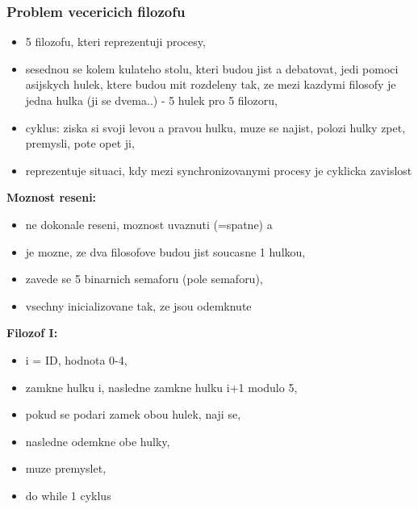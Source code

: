 \documentclass[a4paper, 11pt]{article}
\begin{document}
\subsubsection{Problem vecericich filozofu}
\begin{itemize}
    \item 5 filozofu, kteri reprezentuji procesy,
    \item sesednou se kolem kulateho stolu, kteri budou jist a debatovat, jedi pomoci asijskych hulek, ktere budou mit rozdeleny tak, ze mezi kazdymi filosofy je jedna hulka (ji se dvema..) - 5 hulek pro 5 filozoru,
    \item cyklus: ziska si svoji levou a pravou hulku, muze se najist, polozi hulky zpet, premysli, pote opet ji,
    \item reprezentuje situaci, kdy mezi synchronizovanymi procesy je cyklicka zavislost \\
\end{itemize}

\textbf{Moznost reseni:}
\begin{itemize}
    \item ne dokonale reseni, moznost uvaznuti (=spatne) a
    \item je mozne, ze dva filosofove budou jist soucasne 1 hulkou,
    \item zavede se 5 binarnich semaforu (pole semaforu),
    \item vsechny inicializovane tak, ze jsou odemknute \\
\end{itemize}

\textbf{Filozof I:}
\begin{itemize}
    \item i = ID, hodnota 0-4,
    \item zamkne hulku i, nasledne zamkne hulku i+1 modulo 5,
    \item pokud se podari zamek obou hulek, naji se,
    \item nasledne odemkne obe hulky,
    \item muze premyslet,
    \item do while 1 cyklus \\
\end{itemize}
\end{document}
